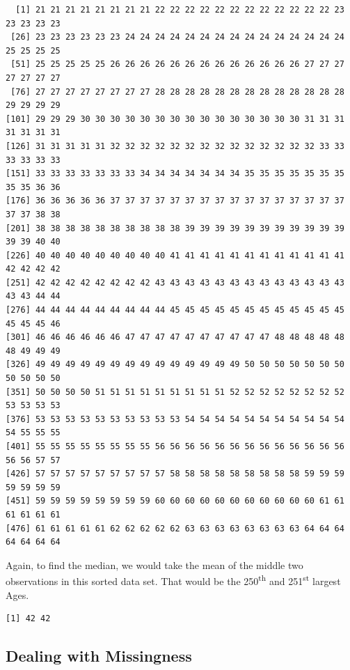 \documentclass[
]{book}
\newenvironment{Shaded}{\begin{snugshade}}{\end{snugshade}}
\newcommand{\DecValTok}[1]{\textcolor[rgb]{0.00,0.00,0.81}{#1}}
\newcommand{\KeywordTok}[1]{\textcolor[rgb]{0.13,0.29,0.53}{\textbf{#1}}}
\newcommand{\NormalTok}[1]{#1}
\newcommand{\OperatorTok}[1]{\textcolor[rgb]{0.81,0.36,0.00}{\textbf{#1}}}
\begin{document}
\begin{verbatim}
  [1] 21 21 21 21 21 21 21 21 22 22 22 22 22 22 22 22 22 22 22 22 23 23 23 23 23
 [26] 23 23 23 23 23 23 24 24 24 24 24 24 24 24 24 24 24 24 24 24 24 25 25 25 25
 [51] 25 25 25 25 25 26 26 26 26 26 26 26 26 26 26 26 26 26 27 27 27 27 27 27 27
 [76] 27 27 27 27 27 27 27 27 28 28 28 28 28 28 28 28 28 28 28 28 28 29 29 29 29
[101] 29 29 29 30 30 30 30 30 30 30 30 30 30 30 30 30 30 30 31 31 31 31 31 31 31
[126] 31 31 31 31 31 32 32 32 32 32 32 32 32 32 32 32 32 32 32 33 33 33 33 33 33
[151] 33 33 33 33 33 33 33 34 34 34 34 34 34 34 35 35 35 35 35 35 35 35 35 36 36
[176] 36 36 36 36 36 37 37 37 37 37 37 37 37 37 37 37 37 37 37 37 37 37 37 38 38
[201] 38 38 38 38 38 38 38 38 38 38 39 39 39 39 39 39 39 39 39 39 39 39 39 40 40
[226] 40 40 40 40 40 40 40 40 40 41 41 41 41 41 41 41 41 41 41 41 41 42 42 42 42
[251] 42 42 42 42 42 42 42 42 43 43 43 43 43 43 43 43 43 43 43 43 43 43 43 44 44
[276] 44 44 44 44 44 44 44 44 44 45 45 45 45 45 45 45 45 45 45 45 45 45 45 45 46
[301] 46 46 46 46 46 46 47 47 47 47 47 47 47 47 47 47 48 48 48 48 48 48 49 49 49
[326] 49 49 49 49 49 49 49 49 49 49 49 49 49 49 50 50 50 50 50 50 50 50 50 50 50
[351] 50 50 50 50 51 51 51 51 51 51 51 51 51 52 52 52 52 52 52 52 52 53 53 53 53
[376] 53 53 53 53 53 53 53 53 53 53 54 54 54 54 54 54 54 54 54 54 54 54 55 55 55
[401] 55 55 55 55 55 55 55 55 56 56 56 56 56 56 56 56 56 56 56 56 56 56 56 57 57
[426] 57 57 57 57 57 57 57 57 57 58 58 58 58 58 58 58 58 58 59 59 59 59 59 59 59
[451] 59 59 59 59 59 59 59 59 60 60 60 60 60 60 60 60 60 60 60 61 61 61 61 61 61
[476] 61 61 61 61 61 62 62 62 62 62 63 63 63 63 63 63 63 63 64 64 64 64 64 64 64
\end{verbatim}

Again, to find the median, we would take the mean of the middle two observations in this sorted data set. That would be the 250\textsuperscript{th} and 251\textsuperscript{st} largest Ages.

\begin{Shaded}
\end{Shaded}

\begin{verbatim}
[1] 42 42
\end{verbatim}

\hypertarget{dealing-with-missingness}{%
\subsection{Dealing with Missingness}\label{dealing-with-missingness}}
\end{document}
